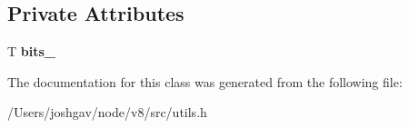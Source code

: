 \subsection*{Private Attributes}
\begin{DoxyCompactItemize}
\item 
T {\bfseries bits\+\_\+}\hypertarget{classv8_1_1internal_1_1_enum_set_a661230c0d3f6c5fe0f9ca7ad6f3b4184}{}\label{classv8_1_1internal_1_1_enum_set_a661230c0d3f6c5fe0f9ca7ad6f3b4184}

\end{DoxyCompactItemize}


The documentation for this class was generated from the following file\+:\begin{DoxyCompactItemize}
\item 
/\+Users/joshgav/node/v8/src/utils.\+h\end{DoxyCompactItemize}
